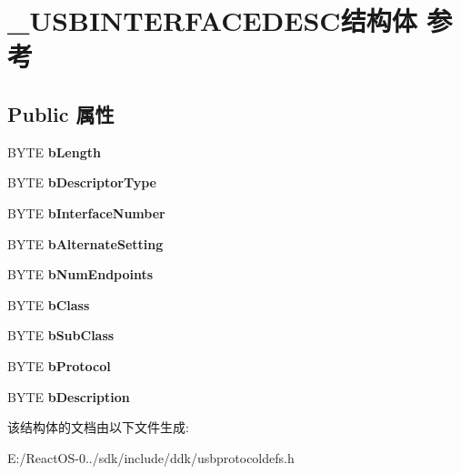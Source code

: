 \hypertarget{struct___u_s_b_i_n_t_e_r_f_a_c_e_d_e_s_c}{}\section{\+\_\+\+U\+S\+B\+I\+N\+T\+E\+R\+F\+A\+C\+E\+D\+E\+S\+C结构体 参考}
\label{struct___u_s_b_i_n_t_e_r_f_a_c_e_d_e_s_c}
\subsection*{Public 属性}
\begin{DoxyCompactItemize}
\item 
\mbox{\label{struct___u_s_b_i_n_t_e_r_f_a_c_e_d_e_s_c_a7354ef1e5c2e1a99d180145ac8d47319}} 
B\+Y\+TE {\bfseries b\+Length}
\item 
\mbox{\label{struct___u_s_b_i_n_t_e_r_f_a_c_e_d_e_s_c_ad1808ee55c3e137ffad04acdc70b8c3f}} 
B\+Y\+TE {\bfseries b\+Descriptor\+Type}
\item 
\mbox{\label{struct___u_s_b_i_n_t_e_r_f_a_c_e_d_e_s_c_af74286016304c56bdd75aa58975f08d8}} 
B\+Y\+TE {\bfseries b\+Interface\+Number}
\item 
\mbox{\label{struct___u_s_b_i_n_t_e_r_f_a_c_e_d_e_s_c_ab390bc8eb01c545a47a4e1e2857720c2}} 
B\+Y\+TE {\bfseries b\+Alternate\+Setting}
\item 
\mbox{\label{struct___u_s_b_i_n_t_e_r_f_a_c_e_d_e_s_c_a93669a675293f073b2b3c5dc18f33d53}} 
B\+Y\+TE {\bfseries b\+Num\+Endpoints}
\item 
\mbox{\label{struct___u_s_b_i_n_t_e_r_f_a_c_e_d_e_s_c_a6feed086f573947bdf42fa8a98a9d908}} 
B\+Y\+TE {\bfseries b\+Class}
\item 
\mbox{\label{struct___u_s_b_i_n_t_e_r_f_a_c_e_d_e_s_c_acb2dcac68d47bd3c1a28960b14c5816b}} 
B\+Y\+TE {\bfseries b\+Sub\+Class}
\item 
\mbox{\label{struct___u_s_b_i_n_t_e_r_f_a_c_e_d_e_s_c_a3fef485a45e30e2b0ef6ae523ae9a47b}} 
B\+Y\+TE {\bfseries b\+Protocol}
\item 
\mbox{\label{struct___u_s_b_i_n_t_e_r_f_a_c_e_d_e_s_c_ae34d92a6b9eba4e9ed9bb9cb256f86d1}} 
B\+Y\+TE {\bfseries b\+Description}
\end{DoxyCompactItemize}


该结构体的文档由以下文件生成\+:\begin{DoxyCompactItemize}
\item 
E\+:/\+React\+O\+S-\/0../sdk/include/ddk/usbprotocoldefs.\+h\end{DoxyCompactItemize}
